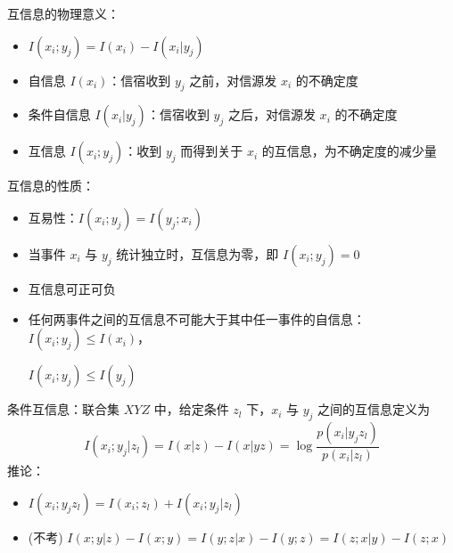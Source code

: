 \begin{remark}
    互信息的物理意义：
    \begin{itemize}
        \item $I(x_i;y_j) = I(x_i) - I(x_i|y_j)$
        \item 自信息 $I(x_i)$：信宿收到 $y_j$ 之前，对信源发 $x_i$ 的不确定度
        \item 条件自信息 $I(x_i|y_j)$：信宿收到 $y_j$ 之后，对信源发 $x_i$ 的不确定度
        \item 互信息 $I(x_i; y_j)$：收到 $y_j$ 而得到关于 $x_i$ 的互信息，为不确定度的减少量
    \end{itemize}    
\end{remark}

\begin{remark}
    互信息的性质：
    \begin{itemize}
        \item 互易性：$I(x_i; y_j) = I(y_j; x_i)$
        \item 当事件 $x_i$ 与 $y_j$ 统计独立时，互信息为零，即 $I(x_i; y_j) = 0$
        \item 互信息可正可负
        \item 任何两事件之间的互信息不可能大于其中任一事件的自信息：$I(x_i; y_j) \le I(x_i)$，\begin{sloppypar}$I(x_i;y_j) \le I(y_j)$\end{sloppypar}
    \end{itemize}
\end{remark}

\begin{remark}
    条件互信息：联合集 $XYZ$ 中，给定条件 $z_l$ 下，$x_i$ 与 $y_j$ 之间的互信息定义为 \[I(x_i; y_j | z_l) = I(x|z) - I(x|yz) = \log\frac{p(x_i|y_jz_l)}{p(x_i|z_l)} \]
    推论：
    \begin{itemize}
        \item $I(x_i;y_jz_l) = I(x_i; z_l) + I(x_i; y_j | z_l)$
        \item (不考) $I(x; y|z) - I(x;y) = I(y;z|x) - I(y;z) = I(z;x|y) - I(z;x)$
    \end{itemize}
\end{remark}

